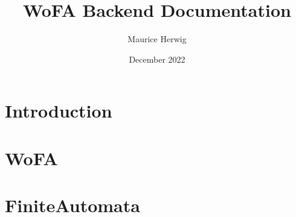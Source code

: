 \documentclass[oneside, a4paper]{article}
\title{WoFA Backend Documentation}
\author{Maurice Herwig}
\date{December 2022}
\begin{document}
\maketitle
\tableofcontents
\newpage

\section{Introduction}

\newpage

\section{WoFA}

\newpage

\section{FiniteAutomata}

\newpage


\end{document}
